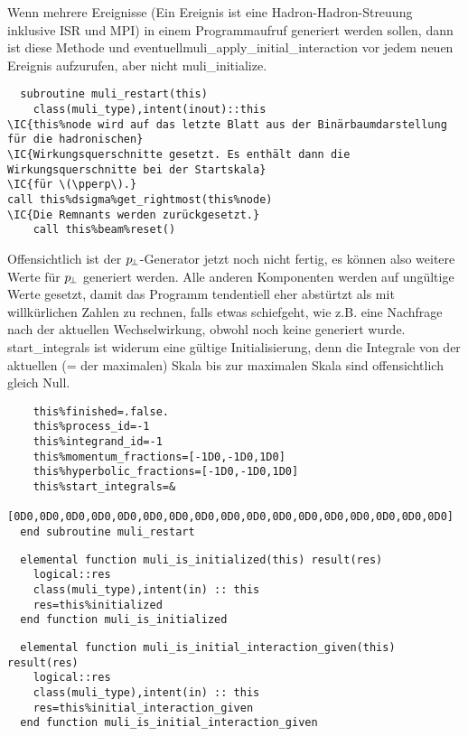 Wenn mehrere Ereignisse (Ein Ereignis ist eine Hadron-Hadron-Streuung inklusive ISR und MPI) in einem Programmaufruf generiert werden sollen, dann ist diese Methode und eventuell\linebreak muli\_apply\_initial\_interaction vor jedem neuen Ereignis aufzurufen, aber nicht muli\_initialize.
\begin{Verbatim}
  subroutine muli_restart(this)
    class(muli_type),intent(inout)::this
\IC{this%node wird auf das letzte Blatt aus der Binärbaumdarstellung für die hadronischen}
\IC{Wirkungsquerschnitte gesetzt. Es enthält dann die Wirkungsquerschnitte bei der Startskala}
\IC{für \(\pperp\).}
call this%dsigma%get_rightmost(this%node)
\IC{Die Remnants werden zurückgesetzt.}
    call this%beam%reset()
\end{Verbatim}
Offensichtlich ist der $p_{\!\perp}$-Generator jetzt noch nicht fertig, es können also weitere Werte für $p_{\!\perp}$ generiert werden. Alle anderen Komponenten werden auf ungültige Werte gesetzt, damit das Programm tendentiell eher abstürtzt als mit willkürlichen Zahlen zu rechnen, falls etwas schiefgeht, wie z.B. eine Nachfrage nach der aktuellen Wechselwirkung, obwohl noch keine generiert wurde. start\_integrals ist widerum eine gültige Initialisierung, denn die Integrale von der aktuellen (= der maximalen) Skala bis zur maximalen Skala sind offensichtlich gleich Null.
\begin{Verbatim}
    this%finished=.false.
    this%process_id=-1
    this%integrand_id=-1
    this%momentum_fractions=[-1D0,-1D0,1D0]
    this%hyperbolic_fractions=[-1D0,-1D0,1D0]
    this%start_integrals=&
    [0D0,0D0,0D0,0D0,0D0,0D0,0D0,0D0,0D0,0D0,0D0,0D0,0D0,0D0,0D0,0D0,0D0]
  end subroutine muli_restart
\end{Verbatim}

\begin{Verbatim}
  elemental function muli_is_initialized(this) result(res)
    logical::res
    class(muli_type),intent(in) :: this
    res=this%initialized
  end function muli_is_initialized
\end{Verbatim}

\begin{Verbatim}
  elemental function muli_is_initial_interaction_given(this) result(res)
    logical::res
    class(muli_type),intent(in) :: this
    res=this%initial_interaction_given
  end function muli_is_initial_interaction_given
\end{Verbatim}


